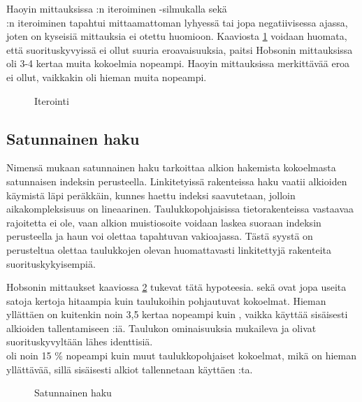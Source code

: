 Haoyin mittauksissa\cite{haoyiBenchmark} :n iteroiminen -silmukalla sekä \\:n iteroiminen tapahtui mittaamattoman lyhyessä tai jopa negatiivisessa ajassa, joten on kyseisiä mittauksia ei otettu huomioon. Kaaviosta \ref{iterointi_kaavio} voidaan huomata, että suorituskyvyissä ei ollut suuria eroavaisuuksia, paitsi Hobsonin mittauksissa\cite{hobsonBenchmark}  oli 3-4 kertaa muita kokoelmia nopeampi. Haoyin mittauksissa\cite{haoyiBenchmark} merkittävää eroa ei ollut, vaikkakin  oli hieman muita nopeampi.

\begin{figure}[h]
    \centering
    
    \caption{Iterointi}\label{iterointi_kaavio}
\end{figure}


\subsection{Satunnainen haku}
Nimensä mukaan satunnainen haku tarkoittaa alkion hakemista kokoelmasta satunnaisen indeksin perusteella. Linkitetyissä rakenteissa haku vaatii alkioiden käymistä läpi peräkkäin, kunnes haettu indeksi saavutetaan, jolloin aikakompleksisuus on lineaarinen. Taulukkopohjaisissa tietorakenteissa vastaavaa rajoitetta ei ole, vaan alkion muistiosoite voidaan laskea suoraan indeksin perusteella ja haun voi olettaa tapahtuvan vakioajassa. Tästä syystä on perusteltua olettaa taulukkojen olevan huomattavasti linkitettyjä rakenteita suorituskykyisempiä.

Hobsonin mittaukset\cite{hobsonBenchmark} kaaviossa \ref{satunnainenHaku_kaavio} tukevat tätä hypoteesia.  sekä  ovat jopa useita satoja kertoja hitaampia kuin taulukoihin pohjautuvat kokoelmat. Hieman yllättäen  on kuitenkin noin 3,5 kertaa nopeampi kuin , vaikka  käyttää sisäisesti alkioiden tallentamiseen :iä. Taulukon ominaisuuksia mukaileva  ja  olivat suorituskyvyltään lähes identtisiä. \\ oli noin 15 \% nopeampi kuin muut taulukkopohjaiset kokoelmat, mikä on hieman yllättävää, sillä sisäisesti alkiot tallennetaan käyttäen :ta.

\begin{figure}[h]
    \centering
    
    \caption{Satunnainen haku}\label{satunnainenHaku_kaavio}
\end{figure}


